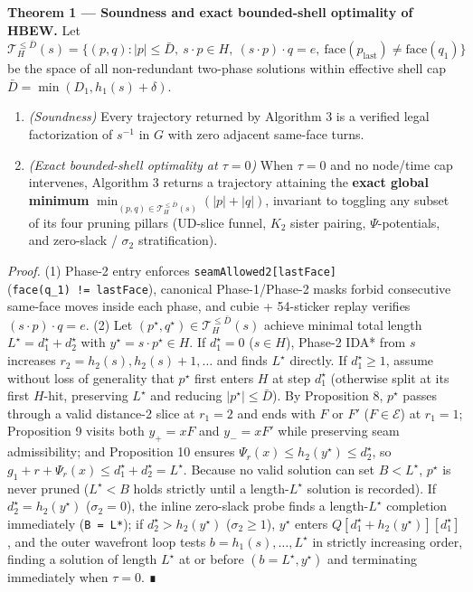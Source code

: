 \documentclass[10pt,twocolumn,letterpaper]{article}
\providecommand{\tightlist}{\setlength{\itemsep}{0pt}\setlength{\parskip}{0pt}}
\begin{document}
\textbf{Theorem 1 --- Soundness and exact bounded-shell optimality of
HBEW.} Let
\(\mathcal T_H^{\le \bar D}(s) = \{(p, q) : |p| \le \bar D,\ s \cdot p \in H,\ (s \cdot p) \cdot q = e,\ \text{face}(p_{\text{last}}) \ne \text{face}(q_1)\}\)
be the space of all non-redundant two-phase solutions within effective
shell cap \(\bar D = \min(D_1, h_1(s)+\delta)\).

\begin{enumerate}
\def\labelenumi{\arabic{enumi}.}
\tightlist
\item
  \emph{(Soundness)} Every trajectory returned by Algorithm 3 is a
  verified legal factorization of \(s^{-1}\) in \(G\) with zero adjacent
  same-face turns.
\item
  \emph{(Exact bounded-shell optimality at \(\tau = 0\))} When
  \(\tau = 0\) and no node/time cap intervenes, Algorithm 3 returns a
  trajectory attaining the \textbf{exact global minimum}
  \(\min_{(p,q) \in \mathcal T_H^{\le \bar D}(s)} (|p| + |q|)\),
  invariant to toggling any subset of its four pruning pillars (UD-slice
  funnel, \(K_2\) sister pairing, \(\Psi\)-potentials, and zero-slack /
  \(\sigma_2\) stratification).
\end{enumerate}

\emph{Proof.} (1) Phase-2 entry enforces
\texttt{seamAllowed2{[}lastFace{]}} (\texttt{face(q\_1)\ !=\ lastFace}),
canonical Phase-1/Phase-2 masks forbid consecutive same-face moves
inside each phase, and cubie + 54-sticker replay verifies
\((s \cdot p) \cdot q = e\). (2) Let
\((p^\star, q^\star) \in \mathcal T_H^{\le \bar D}(s)\) achieve minimal
total length \(L^\star = d_1^\star + d_2^\star\) with
\(y^\star = s \cdot p^\star \in H\). If \(d_1^\star = 0\) (\(s \in H\)),
Phase-2 IDA* from \(s\) increases \(r_2 = h_2(s), h_2(s)+1, \dots\) and
finds \(L^\star\) directly. If \(d_1^\star \ge 1\), assume without loss
of generality that \(p^\star\) first enters \(H\) at step \(d_1^\star\)
(otherwise split at its first \(H\)-hit, preserving \(L^\star\) and
reducing \(|p^\star| \le \bar D\)). By Proposition 8, \(p^\star\) passes
through a valid distance-2 slice at \(r_1=2\) and ends with \(F\) or
\(F'\) (\(F \in \mathcal E\)) at \(r_1=1\); Proposition 9 visits both
\(y_+ = x F\) and \(y_- = x F'\) while preserving seam admissibility;
and Proposition 10 ensures \(\Psi_r(x) \le h_2(y^\star) \le d_2^\star\),
so \(g_1 + r + \Psi_r(x) \le d_1^\star + d_2^\star = L^\star\). Because
no valid solution can set \(B < L^\star\), \(p^\star\) is never pruned
(\(L^\star < B\) holds strictly until a length-\(L^\star\) solution is
recorded). If \(d_2^\star = h_2(y^\star)\) (\(\sigma_2 = 0\)), the
inline zero-slack probe finds a length-\(L^\star\) completion
immediately (\texttt{B\ =\ L*}); if \(d_2^\star > h_2(y^\star)\)
(\(\sigma_2 \ge 1\)), \(y^\star\) enters
\(Q[d_1^\star + h_2(y^\star)][d_1^\star]\), and the outer wavefront loop
tests \(b = h_1(s), \dots, L^\star\) in strictly increasing order,
finding a solution of length \(L^\star\) at or before
\((b = L^\star, y^\star)\) and terminating immediately when
\(\tau = 0\). ∎
\end{document}
